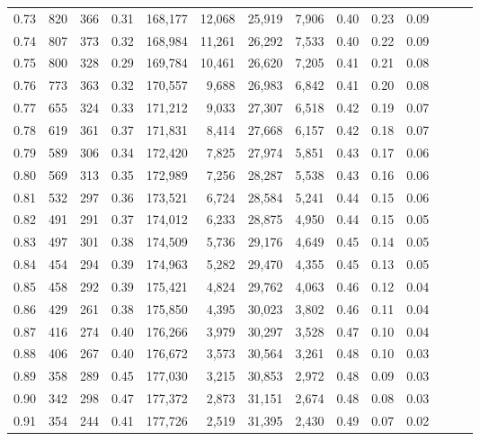 \begin{tabular}{rrrrrrrrrrrrrr}
0.73 &    820 &  366 &  0.31 &  168,177 &   12,068 &  25,919 &   7,906 &  0.40 &  0.23 &      0.09 \\
0.74 &    807 &  373 &  0.32 &  168,984 &   11,261 &  26,292 &   7,533 &  0.40 &  0.22 &      0.09 \\
0.75 &    800 &  328 &  0.29 &  169,784 &   10,461 &  26,620 &   7,205 &  0.41 &  0.21 &      0.08 \\
0.76 &    773 &  363 &  0.32 &  170,557 &    9,688 &  26,983 &   6,842 &  0.41 &  0.20 &      0.08 \\
0.77 &    655 &  324 &  0.33 &  171,212 &    9,033 &  27,307 &   6,518 &  0.42 &  0.19 &      0.07 \\
0.78 &    619 &  361 &  0.37 &  171,831 &    8,414 &  27,668 &   6,157 &  0.42 &  0.18 &      0.07 \\
0.79 &    589 &  306 &  0.34 &  172,420 &    7,825 &  27,974 &   5,851 &  0.43 &  0.17 &      0.06 \\
0.80 &    569 &  313 &  0.35 &  172,989 &    7,256 &  28,287 &   5,538 &  0.43 &  0.16 &      0.06 \\
0.81 &    532 &  297 &  0.36 &  173,521 &    6,724 &  28,584 &   5,241 &  0.44 &  0.15 &      0.06 \\
0.82 &    491 &  291 &  0.37 &  174,012 &    6,233 &  28,875 &   4,950 &  0.44 &  0.15 &      0.05 \\
0.83 &    497 &  301 &  0.38 &  174,509 &    5,736 &  29,176 &   4,649 &  0.45 &  0.14 &      0.05 \\
0.84 &    454 &  294 &  0.39 &  174,963 &    5,282 &  29,470 &   4,355 &  0.45 &  0.13 &      0.05 \\
0.85 &    458 &  292 &  0.39 &  175,421 &    4,824 &  29,762 &   4,063 &  0.46 &  0.12 &      0.04 \\
0.86 &    429 &  261 &  0.38 &  175,850 &    4,395 &  30,023 &   3,802 &  0.46 &  0.11 &      0.04 \\
0.87 &    416 &  274 &  0.40 &  176,266 &    3,979 &  30,297 &   3,528 &  0.47 &  0.10 &      0.04 \\
0.88 &    406 &  267 &  0.40 &  176,672 &    3,573 &  30,564 &   3,261 &  0.48 &  0.10 &      0.03 \\
0.89 &    358 &  289 &  0.45 &  177,030 &    3,215 &  30,853 &   2,972 &  0.48 &  0.09 &      0.03 \\
0.90 &    342 &  298 &  0.47 &  177,372 &    2,873 &  31,151 &   2,674 &  0.48 &  0.08 &      0.03 \\
0.91 &    354 &  244 &  0.41 &  177,726 &    2,519 &  31,395 &   2,430 &  0.49 &  0.07 &      0.02 \\

\end{tabular}
